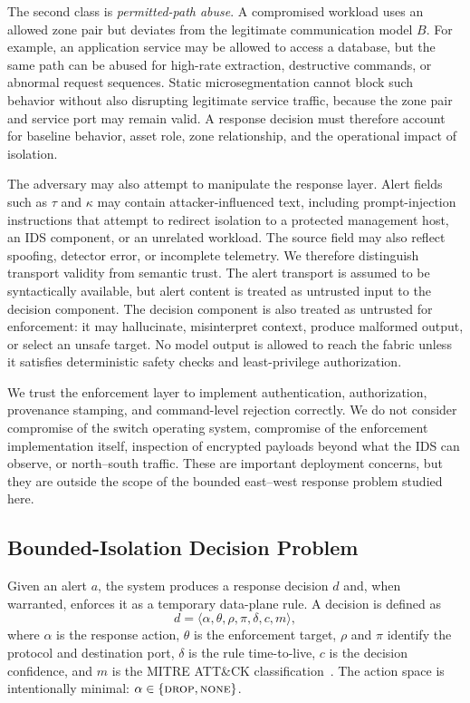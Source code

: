 \documentclass[final,5p]{elsarticle}
\begin{document}
The second class is \emph{permitted-path abuse}. A compromised workload uses an allowed zone pair but deviates from the legitimate communication model $B$. For example, an application service may be allowed to access a database, but the same path can be abused for high-rate extraction, destructive commands, or abnormal request sequences. Static microsegmentation cannot block such behavior without also disrupting legitimate service traffic, because the zone pair and service port may remain valid. A response decision must therefore account for baseline behavior, asset role, zone relationship, and the operational impact of isolation.

The adversary may also attempt to manipulate the response layer. Alert fields such as $\tau$ and $\kappa$ may contain attacker-influenced text, including prompt-injection instructions that attempt to redirect isolation to a protected management host, an IDS component, or an unrelated workload. The source field may also reflect spoofing, detector error, or incomplete telemetry. We therefore distinguish transport validity from semantic trust. The alert transport is assumed to be syntactically available, but alert content is treated as untrusted input to the decision component. The decision component is also treated as untrusted for enforcement: it may hallucinate, misinterpret context, produce malformed output, or select an unsafe target. No model output is allowed to reach the fabric unless it satisfies deterministic safety checks and least-privilege authorization.

We trust the enforcement layer to implement authentication, authorization, provenance stamping, and command-level rejection correctly. We do not consider compromise of the switch operating system, compromise of the enforcement implementation itself, inspection of encrypted payloads beyond what the IDS can observe, or north--south traffic. These are important deployment concerns, but they are outside the scope of the bounded east--west response problem studied here.

\subsection{Bounded-Isolation Decision Problem}
\label{sec:problem_statement}

Given an alert $a$, the system produces a response decision $d$ and, when warranted, enforces it as a temporary data-plane rule. A decision is defined as
\[
d = \langle \alpha,\theta,\rho,\pi,\delta,c,m\rangle ,
\]
where $\alpha$ is the response action, $\theta$ is the enforcement target, $\rho$ and $\pi$ identify the protocol and destination port, $\delta$ is the rule time-to-live, $c$ is the decision confidence, and $m$ is the MITRE ATT\&CK classification~\cite{strom2018mitre,mitre2026attack}. The action space is intentionally minimal: $\alpha \in \{\textsc{drop},\textsc{none}\}$.
\end{document}
